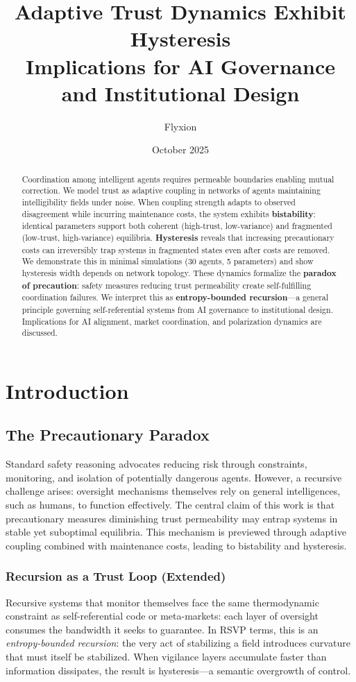 \documentclass[12pt,a4paper]{article}
\title{\Huge\textbf{Adaptive Trust Dynamics Exhibit Hysteresis}\\[0.5em] \Large Implications for AI Governance and Institutional Design}
\author{Flyxion}
\date{October 2025}
\begin{document}
\maketitle

\begin{abstract}
Coordination among intelligent agents requires permeable boundaries enabling mutual correction. We model trust as adaptive coupling in networks of agents maintaining intelligibility fields under noise. When coupling strength adapts to observed disagreement while incurring maintenance costs, the system exhibits \textbf{bistability}: identical parameters support both coherent (high-trust, low-variance) and fragmented (low-trust, high-variance) equilibria. \textbf{Hysteresis} reveals that increasing precautionary costs can irreversibly trap systems in fragmented states even after costs are removed. We demonstrate this in minimal simulations (30 agents, 5 parameters) and show hysteresis width depends on network topology. These dynamics formalize the \textbf{paradox of precaution}: safety measures reducing trust permeability create self-fulfilling coordination failures. We interpret this as \textbf{entropy-bounded recursion}---a general principle governing self-referential systems from AI governance to institutional design. Implications for AI alignment, market coordination, and polarization dynamics are discussed.
\end{abstract}

\tableofcontents
\newpage

\section{Introduction}

\subsection{The Precautionary Paradox}
Standard safety reasoning advocates reducing risk through constraints, monitoring, and isolation of potentially dangerous agents. However, a recursive challenge arises: oversight mechanisms themselves rely on general intelligences, such as humans, to function effectively. The central claim of this work is that precautionary measures diminishing trust permeability may entrap systems in stable yet suboptimal equilibria. This mechanism is previewed through adaptive coupling combined with maintenance costs, leading to bistability and hysteresis.

\subsubsection{Recursion as a Trust Loop (Extended)}
Recursive systems that monitor themselves face the same thermodynamic constraint as self-referential code or meta-markets: each layer of oversight consumes the bandwidth it seeks to guarantee. In RSVP terms, this is an \emph{entropy-bounded recursion}: the very act of stabilizing a field introduces curvature that must itself be stabilized. When vigilance layers accumulate faster than information dissipates, the result is hysteresis---a semantic overgrowth of control.
\end{document}
